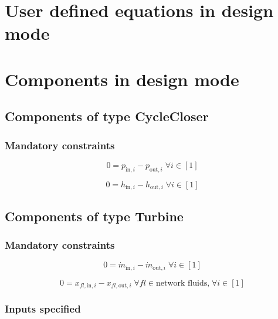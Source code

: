 \section{User defined equations in design mode}

\section{Components in design mode}

\subsection{Components of type CycleCloser}

\subsubsection{Mandatory constraints}

\begin{equation}
\label{eq:CycleCloser_pressure_equality_constraints}
0=p_{\mathrm{in,}i}-p_{\mathrm{out,}i}\; \forall i \in [1]
\end{equation}

\begin{equation}
\label{eq:CycleCloser_enthalpy_equality_constraints}
0=h_{\mathrm{in,}i}-h_{\mathrm{out,}i}\; \forall i \in [1]
\end{equation}


\subsection{Components of type Turbine}

\subsubsection{Mandatory constraints}

\begin{equation}
\label{eq:Turbine_mass_flow_constraints}
0=\dot{m}_{\mathrm{in,}i}-\dot{m}_{\mathrm{out,}i}\; \forall i \in [1]
\end{equation}

\begin{equation}
\label{eq:Turbine_fluid_constraints}
0=x_{fl\mathrm{,in,}i}-x_{fl\mathrm{,out,}i}\;\forall fl \in\text{network fluids,}\; \forall i \in [1]
\end{equation}


\subsubsection{Inputs specified}

